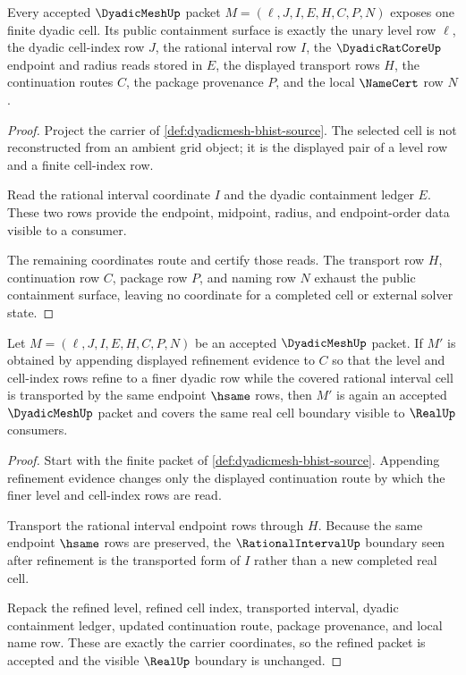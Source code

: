 \begin{theorem}
\label{thm:dyadicmesh-cell-containment-obligation}
Every accepted $\DyadicMeshUp$ packet $M=(\ell,J,I,E,H,C,P,N)$ exposes one finite dyadic cell. Its public containment surface is exactly the unary level row $\ell$, the dyadic cell-index row $J$, the rational interval row $I$, the $\DyadicRatCoreUp$ endpoint and radius reads stored in $E$, the displayed transport rows $H$, the continuation routes $C$, the package provenance $P$, and the local $\NameCert$ row $N$.
\end{theorem}
\begin{proof}
Project the carrier of \autoref{def:dyadicmesh-bhist-source}. The selected cell is not reconstructed from an ambient grid object; it is the displayed pair of a level row and a finite cell-index row.

Read the rational interval coordinate $I$ and the dyadic containment ledger $E$. These two rows provide the endpoint, midpoint, radius, and endpoint-order data visible to a consumer.

The remaining coordinates route and certify those reads. The transport row $H$, continuation row $C$, package row $P$, and naming row $N$ exhaust the public containment surface, leaving no coordinate for a completed cell or external solver state.
\end{proof}

\begin{theorem}
\label{thm:dyadicmesh-refinement-stability}
Let $M=(\ell,J,I,E,H,C,P,N)$ be an accepted $\DyadicMeshUp$ packet. If $M'$ is obtained by appending displayed refinement evidence to $C$ so that the level and cell-index rows refine to a finer dyadic row while the covered rational interval cell is transported by the same endpoint $\hsame$ rows, then $M'$ is again an accepted $\DyadicMeshUp$ packet and covers the same real cell boundary visible to $\RealUp$ consumers.
\end{theorem}
\begin{proof}
Start with the finite packet of \autoref{def:dyadicmesh-bhist-source}. Appending refinement evidence changes only the displayed continuation route by which the finer level and cell-index rows are read.

Transport the rational interval endpoint rows through $H$. Because the same endpoint $\hsame$ rows are preserved, the $\RationalIntervalUp$ boundary seen after refinement is the transported form of $I$ rather than a new completed real cell.

Repack the refined level, refined cell index, transported interval, dyadic containment ledger, updated continuation route, package provenance, and local name row. These are exactly the carrier coordinates, so the refined packet is accepted and the visible $\RealUp$ boundary is unchanged.
\end{proof}

